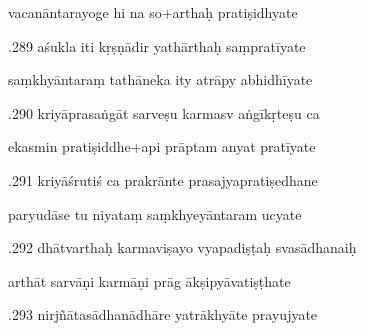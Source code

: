 \documentclass[article,12pt,a4paper]{memoir}%
\newcounter{parCount}
\begin{document}
	  
	  \pstart \leavevmode%
	vacanāntarayoge hi na so+arthaḥ pratiṣidhyate 
	{}
	\pend%
      

	  
	  \pstart {}.289 aśukla iti kṛṣṇādir yathārthaḥ saṃpratīyate 
	{}
	\pend%
      

	  
	  \pstart \leavevmode%
	saṃkhyāntaraṃ tathāneka ity atrāpy abhidhīyate 
	{}
	\pend%
      

	  
	  \pstart {}.290 kriyāprasaṅgāt sarveṣu karmasv aṅgīkṛteṣu ca 
	{}
	\pend%
      

	  
	  \pstart \leavevmode%
	ekasmin pratiṣiddhe+api prāptam anyat pratīyate 
	{}
	\pend%
      

	  
	  \pstart {}.291 kriyāśrutiś ca prakrānte   prasajyapratiṣedhane 
	{}
	\pend%
      

	  
	  \pstart \leavevmode%
	paryudāse tu niyataṃ saṃkhyeyāntaram ucyate 
	{}
	\pend%
      

	  
	  \pstart {}.292 dhātvarthaḥ karmaviṣayo vyapadiṣṭaḥ svasādhanaiḥ 
	{}
	\pend%
      

	  
	  \pstart \leavevmode%
	arthāt sarvāṇi karmāṇi prāg ākṣipyāvatiṣṭhate 
	{}
	\pend%
      

	  
	  \pstart {}.293 nirjñātasādhanādhāre yatrākhyāte prayujyate 
	{}
	\pend%
      
\end{document}
